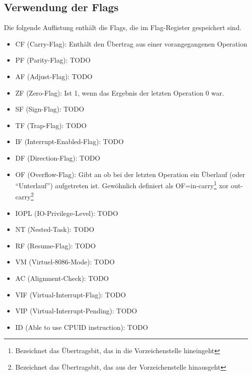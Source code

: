 \begin{multicols}{3}
\subsection{Verwendung der Flags}
Die folgende Auflistung enthält die Flags, die im Flag-Register gespeichert sind.
\begin{itemize}
\item CF (Carry-Flag): Enthält den Übertrag aus einer vorangegangenen Operation
\item PF (Parity-Flag): TODO
\item AF (Adjust-Flag): TODO
\item ZF (Zero-Flag): Ist 1, wenn das Ergebnis der letzten Operation 0 war.
\item SF (Sign-Flag): TODO
\item TF (Trap-Flag): TODO
\item IF (Interrupt-Enabled-Flag): TODO
\item DF (Direction-Flag): TODO
\item OF (Overflow-Flag): Gibt an ob bei der letzten Operation ein Überlauf (oder \enquote{Unterlauf}) aufgetreten ist. Gewöhnlich definiert als OF=in-carry\footnote{Bezeichnet das Übertragsbit, das in die Vorzeichenstelle hineingeht} xor out-carry\footnote{Bezeichnet das Übertragsbit, das aus der Vorzeichenstelle hinausgeht}
\item IOPL (IO-Privilege-Level): TODO
\item NT (Nested-Task): TODO
\item RF (Resume-Flag): TODO
\item VM (Virtuel-8086-Mode): TODO
\item AC (Alignment-Check): TODO
\item VIF (Virtual-Interrupt-Flag): TODO
\item VIP (Virtual-Interrupt-Pending): TODO
\item ID (Able to use CPUID instruction): TODO
\end{itemize}
\end{multicols}